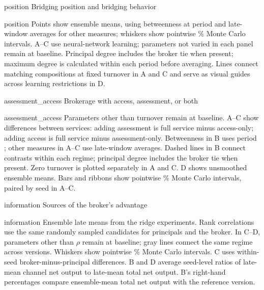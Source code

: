 
\begin{ptitle}{position}
Bridging position and bridging behavior
\end{ptitle}
\begin{pcaption}{position}
Points show ensemble means, using betweenness at period  and late-window averages for other measures; whiskers show pointwise \% Monte Carlo intervals. A--C use neural-network learning; parameters not varied in each panel remain at baseline. Principal degree includes the broker tie when present; maximum degree is calculated within each period before averaging. Lines connect matching compositions at fixed turnover in A and C and serve as visual guides across learning restrictions in D.
\end{pcaption}

\begin{ptitle}{assessment_access}
Brokerage with access, assessment, or both
\end{ptitle}
\begin{pcaption}{assessment_access}
Parameters other than turnover remain at baseline. A--C show differences between services: adding assessment is full service minus access-only; adding access is full service minus assessment-only. Betweenness in B uses period ; other measures in A--C use late-window averages. Dashed lines in B connect contrasts within each regime; principal degree includes the broker tie when present. Zero turnover is plotted separately in A and C. D shows unsmoothed ensemble means. Bars and ribbons show pointwise \% Monte Carlo intervals, paired by seed in A--C.
\end{pcaption}

\begin{ptitle}{information}
Sources of the broker's advantage
\end{ptitle}
\begin{pcaption}{information}
Ensemble late means from the ridge experiments. Rank correlations use the same
randomly sampled candidates for principals and the broker. In C--D, parameters
other than $\rho$ remain at baseline; gray lines connect the same regime across
versions. Whiskers show pointwise \% Monte Carlo intervals.
C uses within-seed broker-minus-principal differences. B and D average seed-level ratios of late-mean channel net output to late-mean total net output. B's right-hand percentages compare ensemble-mean total net
output with the reference version.
\end{pcaption}

